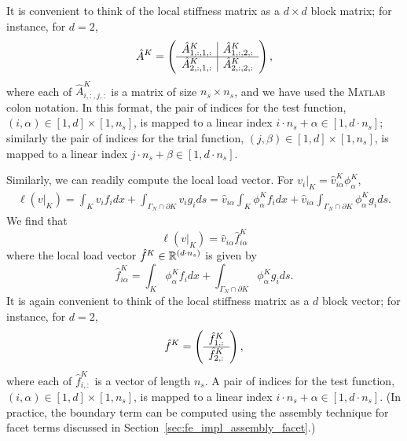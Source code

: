 It is convenient to think of the local stiffness matrix as a $d \times d$ block matrix; for instance, for $d = 2$,
\begin{equation*}
  \hat A^K = \bmat{c|c}
  \hat A^{K}_{1,:,1,:} &  \hat A^{K}_{1,:,2,:} \\
  \hline
  \hat A^{K}_{2,:,1,:} &  \hat A^{K}_{2,:,2,:}
  \emat,
\end{equation*}
where each of $\hat A^K_{i,:,j,:}$ is a matrix of size $n_s \times n_s$, and we have used the \textsc{Matlab} colon notation. In this format, the pair of indices for the test function, $(i, \alpha)\in [1,d] \times [1,n_s]$, is mapped to a linear index $i \cdot n_s + \alpha \in [1,d\cdot n_s]$; similarly the pair of indices for the trial function, $(j,\beta)\in [1,d] \times [1,n_s]$, is mapped to a linear index $j \cdot n_s + \beta \in [1,d\cdot n_s]$.

Similarly, we can readily compute the local load vector. For $v_i|_K = \hat v^K_{i\alpha} \phi^K_\alpha$, 
\begin{align*}
  \ell(v|_K) = \int_K v_i f_i dx + \int_{\Gamma_N \cap \partial K} v_i g_i ds 
  =  \hat v_{i\alpha} \int_K \phi^K_\alpha f_{i} dx + \hat v_{i\alpha} \int_{\Gamma_N \cap \partial K} \phi^K_\alpha g_i ds.
\end{align*}
We find that
\begin{equation*}
  \ell(v|_K) = \hat v_{i\alpha} \hat f^K_{i\alpha}
\end{equation*}
where the local load vector $\hat f^K \in \RR^{(d\cdot n_s)}$ is given by
\begin{equation*}
  \hat f^K_{i\alpha} =  \int_K \phi^K_\alpha f_{i} dx + \int_{\Gamma_N \cap \partial K} \phi^K_\alpha g_i ds.
\end{equation*}
It is again convenient to think of the local stiffness matrix as a $d$ block vector; for instance, for $d = 2$,
\begin{equation*}
  \hat f^K = \bmat{c} \hat f^K_{1,:} \\ \hline \hat f^K_{2,:} \emat,
\end{equation*}
where each of $\hat f^K_{i,:}$ is a vector of length $n_s$. A pair of indices for the test function, $(i,\alpha) \in [1,d] \times [1,n_s]$, is mapped to a linear index $i \cdot n_s + \alpha \in [1,d\cdot n_s]$. (In practice, the boundary term can be computed using the assembly technique for facet terms discussed in Section~\ref{sec:fe_impl_assembly_facet}.)

